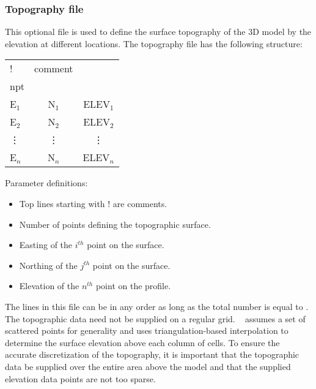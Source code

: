 
\subsubsection{Topography file}
This optional file is used to define the surface topography of the 3D model by the elevation at different locations. The topography file has the following structure:
%
\begin{fileExample}
\begin{tabular}{|lcc|}
\hline
! & comment & \\
npt & & \\
E$_1$ & N$_1$ & ELEV$_1$ \\
E$_2$ & N$_2$ & ELEV$_2$ \\
\vdots & \vdots & \vdots \\
E$_n$ & N$_n$ & ELEV$_n$ \\
\hline
\end{tabular}
\end{fileExample}
%
Parameter definitions:
\begin{itemize}
\item[\codeName{!}] Top lines starting with ! are comments.
\item[\codeName{npt}] Number of points defining the topographic surface.
\item[\codeName{E$_n$}] Easting of the $i^{th}$  point on the surface.
\item[\codeName{N$_n$}] Northing of the $j^{th}$  point on the surface.
\item[\codeName{ELEV$_n$}] Elevation of the $n^{th}$  point on the profile.
\end{itemize}
%
The lines in this file can be in any order as long as the total number is equal to . The topographic data need not be supplied on a regular grid. \programName~ assumes a set of scattered points for generality and uses triangulation-based interpolation to determine the surface elevation above each column of cells. To ensure the accurate discretization of the topography, it is important that the topographic data be supplied over the entire area above the model and that the supplied elevation data points are not too sparse.

